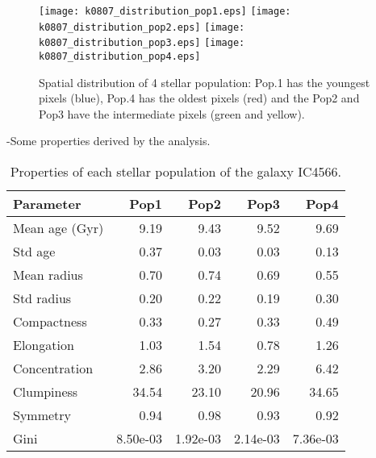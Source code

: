 \begin{figure}[bh]
\begin{center}
\texttt{[image: k0807\_distribution\_pop1.eps]}
\texttt{[image: k0807\_distribution\_pop2.eps]}
\texttt{[image: k0807\_distribution\_pop3.eps]}
\texttt{[image: k0807\_distribution\_pop4.eps]}
 \caption{Spatial distribution of 4 stellar population: Pop.1 has the youngest pixels (blue), Pop.4 has the oldest pixels (red) and the Pop2 and Pop3 have the intermediate pixels (green and yellow).}
   \label{fig1}
\end{center}
\end{figure}


-Some properties derived by the analysis.


\begin{table}[h]
\centering
\begin{tabular}{l|r|r|r|r}
Parameter & Pop1 & Pop2 & Pop3 & Pop4 \\\hline
Mean age (Gyr) & 9.19 & 9.43 & 9.52 & 9.69 \\
Std age & 0.37 & 0.03 & 0.03 & 0.13 \\
Mean radius & 0.70 & 0.74 & 0.69 & 0.55 \\
Std radius & 0.20 & 0.22 & 0.19 & 0.30 \\
Compactness & 0.33 & 0.27 & 0.33 & 0.49 \\
Elongation & 1.03 & 1.54 & 0.78 & 1.26 \\
Concentration & 2.86 & 3.20 & 2.29 & 6.42 \\
Clumpiness & 34.54 & 23.10 & 20.96 & 34.65\\
Symmetry & 0.94 &0.98 & 0.93 & 0.92\\
Gini & 8.50e-03 & 1.92e-03 & 2.14e-03 & 7.36e-03 \\
\end{tabular}
\caption{\label{tab:widgets}Properties of each stellar population of the galaxy IC4566.}
\end{table}


